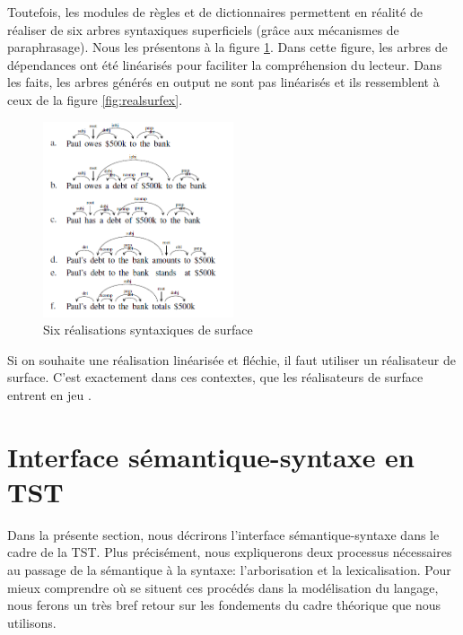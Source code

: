 Toutefois, les modules de règles et de dictionnaires permettent en réalité de réaliser de six arbres syntaxiques superficiels (grâce aux mécanismes de paraphrasage). Nous les présentons à la figure \ref{fig:6realsurf}. Dans cette figure, les arbres de dépendances ont été linéarisés pour faciliter la compréhension du lecteur. Dans les faits, les arbres générés en output ne sont pas linéarisés et ils ressemblent à ceux de la figure \ref{fig:realsurfex}.

\begin{figure}[htb]
	\centering
	\includegraphics[width=0.5\textwidth, trim = {0cm 0cm 0cm 0cm},clip]{ch3/figs/exemples_real.png}
	\caption{Six réalisations syntaxiques de surface \citep{lareau18}}
	\label{fig:6realsurf}
\end{figure}

Si on souhaite une réalisation linéarisée et fléchie,  il faut utiliser un réalisateur de surface. C'est exactement dans ces contextes, que les réalisateurs de surface entrent en jeu \citep{DaoustJSREALTextRealizer2015, MolinsJSrealBBilingualText2015, GattSimpleNLGRealisationEngine2009, MilleSharedTaskProposal2017a,BelzFirstSurfaceRealisation2011}.


\section{Interface sémantique-syntaxe en TST}\label{sec:semsynt}

Dans la présente section, nous décrirons l'interface sémantique-syntaxe dans le cadre de la \ac{TST}. Plus précisément, nous expliquerons deux processus nécessaires au passage de la sémantique à la syntaxe: l'arborisation et la lexicalisation. Pour mieux comprendre où se situent ces procédés dans la modélisation du langage, nous ferons un très bref retour sur les fondements du cadre théorique que nous utilisons. 

